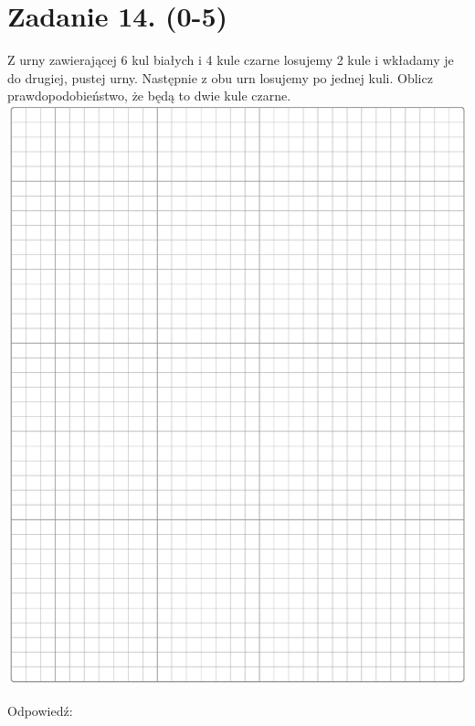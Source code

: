 \documentclass[10pt]{article}
\begin{document}
\section*{Zadanie 14. (0-5)}
Z urny zawierającej 6 kul białych i 4 kule czarne losujemy 2 kule i wkładamy je do drugiej, pustej urny. Następnie z obu urn losujemy po jednej kuli. Oblicz prawdopodobieństwo, że będą to dwie kule czarne.\\
\includegraphics[max width=\textwidth, center]{2024_11_21_e30d1f37bf0e3631c088g-13}

Odpowiedź: \(\qquad\)
\end{document}
